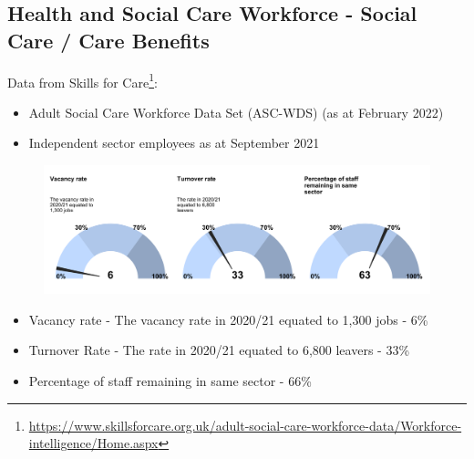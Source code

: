 


\subsection{Health and Social Care Workforce - Social Care / Care Benefits}
Data from Skills for Care\footnote{\url{https://www.skillsforcare.org.uk/adult-social-care-workforce-data/Workforce-intelligence/Home.aspx}}:
\begin{itemize}[noitemsep]
    \item Adult Social Care Workforce Data Set (ASC-WDS) (as at February 2022)
    \item Independent sector employees as at September 2021
\end{itemize}

\begin{figure}[h]
    \centering
    \includegraphics[width=\linewidth]{images/workforce_dial_chart.png}
\end{figure}

\begin{itemize}[noitemsep]
    \item Vacancy rate - The vacancy rate in 2020/21 equated to 1,300 jobs - 6\%
    \item Turnover Rate - The rate in 2020/21 equated to 6,800 leavers - 33\%
    \item Percentage of staff remaining in same sector - 66\%
\end{itemize} 

